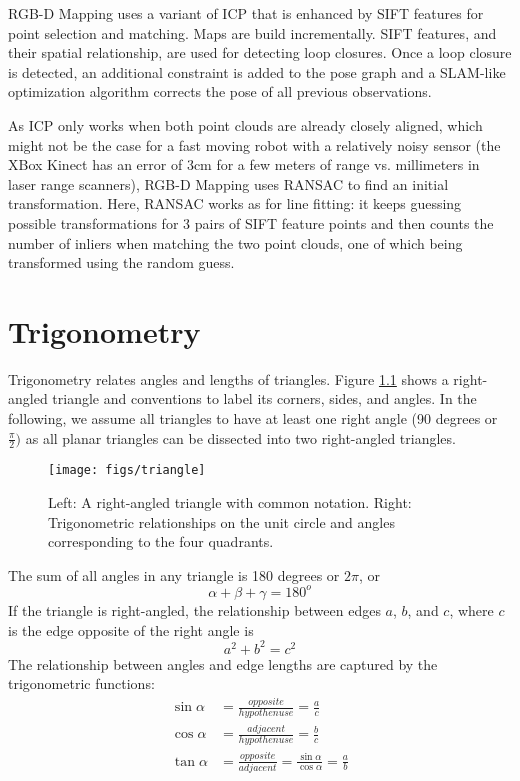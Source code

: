 \documentclass[paper=6.14in:9.21in,pagesize=pdftex,11pt,twoside,openright]{scrbook}
\begin{document}
RGB-D Mapping uses a variant of ICP that is enhanced by SIFT features for point selection and matching. Maps are build incrementally. SIFT features, and their spatial relationship, are used for detecting loop closures. Once a loop closure is detected, an additional constraint is added to the pose graph and a SLAM-like optimization algorithm corrects the pose of all previous observations.

As ICP only works when both point clouds are already closely aligned, which might not be the case for a fast moving robot with a relatively noisy sensor (the XBox Kinect has an error of 3cm for a few meters of range vs. millimeters in laser range scanners), RGB-D Mapping uses RANSAC to find an initial transformation. Here, RANSAC works as for line fitting: it keeps guessing possible transformations for 3 pairs of SIFT feature points and then counts the number of inliers when matching the two point clouds, one of which being transformed using the random guess.



\appendix
\chapter{Trigonometry}
Trigonometry relates angles and lengths of triangles. Figure \ref{fig:triangle} shows a right-angled triangle and conventions to label its corners, sides, and angles. In the following, we assume all triangles to have at least one right angle (90 degrees or $\frac{\pi}{2})$ as all planar triangles can be dissected into two right-angled triangles.

\begin{figure}[!htb]
\centering
\texttt{[image: figs/triangle]}
\caption{Left: A right-angled triangle with common notation. Right: Trigonometric relationships on the unit circle and angles corresponding to the four quadrants. \label{fig:triangle}}
\end{figure}

The sum of all angles in any triangle is 180 degrees or $2\pi$, or
\begin{equation}
\alpha + \beta + \gamma = 180^o
\end{equation}
If the triangle is right-angled, the relationship between edges $a$, $b$, and $c$, where $c$ is the edge opposite of the right angle is
\begin{equation}
a^2+b^2=c^2
\end{equation}
The relationship between angles and edge lengths are captured by the trigonometric functions:
\begin{eqnarray}
\sin{\alpha}&=\frac{opposite}{hypothenuse}=\frac{a}{c}\\
\cos{\alpha}&=\frac{adjacent}{hypothenuse}=\frac{b}{c}\\
\tan{\alpha}&=\frac{opposite}{adjacent}=\frac{\sin{\alpha}}{\cos{\alpha}}=\frac{a}{b}
\end{eqnarray}
\end{document}
